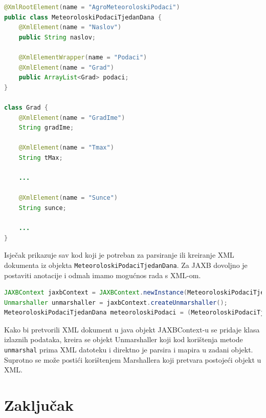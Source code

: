 \documentclass{foi}
\begin{document}
\begin{lstlisting}[language=java, caption={Primjer JAXB anotacija na klasama}]
@XmlRootElement(name = "AgroMeteoroloskiPodaci")
public class MeteoroloskiPodaciTjedanDana {
    @XmlElement(name = "Naslov")
    public String naslov;

    @XmlElementWrapper(name = "Podaci")
    @XmlElement(name = "Grad")
    public ArrayList<Grad> podaci;
}

class Grad {
    @XmlElement(name = "GradIme")
    String gradIme;

    @XmlElement(name = "Tmax")
    String tMax;

    ...

    @XmlElement(name = "Sunce")
    String sunce;

    ...
}
\end{lstlisting}

Isječak prikazuje sav kod koji je potreban za parsiranje ili kreiranje XML dokumenta iz
objekta \texttt{MeteoroloskiPodaciTjedanDana}. Za JAXB dovoljno je postaviti anotacije
i odmah imamo mogućnos rada s XML-om.

\begin{lstlisting}[language=java, caption={Pretvaranje XML dokumenta u Java objekte korištenjem JAXB}]
JAXBContext jaxbContext = JAXBContext.newInstance(MeteoroloskiPodaciTjedanDana.class);
Unmarshaller unmarshaller = jaxbContext.createUnmarshaller();
MeteoroloskiPodaciTjedanDana meteoroloskiPodaci = (MeteoroloskiPodaciTjedanDana) unmarshaller.unmarshal(DemoDatoteke.demoSedmodnevniPodaciXML());
\end{lstlisting}

Kako bi pretvorili XML dokument u java objekt JAXBContext-u se pridaje klasa izlaznih
podataka, kreira se objekt Unmarshaller koji kod korištenja metode \texttt{unmarshal}
prima XML datoteku i direktno je parsira i mapira u zadani objekt.
Suprotno se može postići korištenjem Marshallera koji pretvara postojeći objekt u XML.

\chapter{Zaključak}

\printbibliography[title=Popis literature]

\listoffigures
{}
\end{document}
